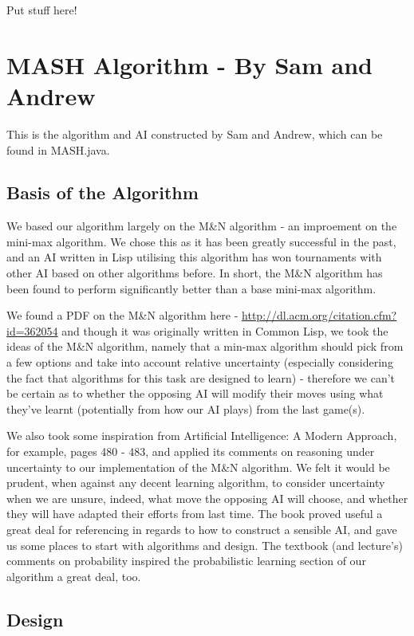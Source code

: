 \documentclass[11pt]{article}
\begin{document}
Put stuff here!
\section{MASH Algorithm - By Sam and Andrew}
\label{sec-3}

This is the algorithm and AI constructed by Sam and Andrew, which can be found in MASH.java.

\subsection{Basis of the Algorithm}
\label{sec-3-1}

We based our algorithm largely on the M\&N algorithm - an improement on the mini-max algorithm. We chose this as it has been greatly successful in the past, and an AI written in Lisp utilising this algorithm has won tournaments with other AI based on other algorithms before. In short, the M\&N algorithm has been found to perform significantly better than a base mini-max algorithm.

We found a PDF on the M\&N algorithm here - \url{http://dl.acm.org/citation.cfm?id=362054} and though it was originally written in Common Lisp, we took the ideas of the M\&N algorithm, namely that a min-max algorithm should pick from a few options and take into account relative uncertainty (especially considering the fact that algorithms for this task are designed to learn) - therefore we can't be certain as to whether the opposing AI will modify their moves using what they've learnt (potentially from how our AI plays) from the last game(s).

We also took some inspiration from Artificial Intelligence: A Modern Approach, for example, pages 480 - 483, and applied its comments on reasoning under uncertainty to our implementation of the M\&N algorithm. We felt it would be prudent, when against any decent learning algorithm, to consider uncertainty when we are unsure, indeed, what move the opposing AI will choose, and whether they will have adapted their efforts from last time. The book proved useful a great deal for referencing in regards to how to construct a sensible AI, and gave us some places to start with algorithms and design. The textbook (and lecture's) comments on probability inspired the probabilistic learning section of our algorithm a great deal, too.
\subsection{Design}
\label{sec-3-2}
\end{document}
